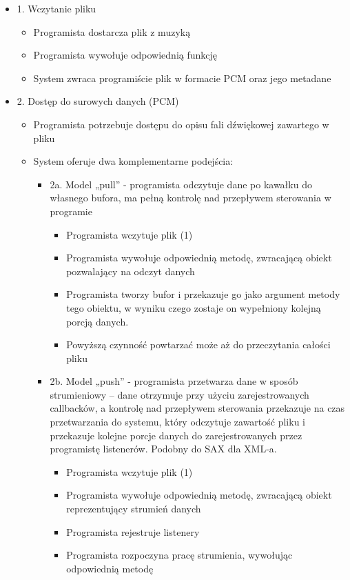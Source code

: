 \begin{itemize}
	\item 1. Wczytanie pliku
	\begin{itemize}
		\item Programista dostarcza plik z muzyką
		\item Programista wywołuje odpowiednią funkcję
		\item System zwraca programiście plik w formacie PCM oraz jego metadane
	\end{itemize}
	\item 2. Dostęp do surowych danych (PCM)
	\begin{itemize}
		\item Programista potrzebuje dostępu do opisu fali dźwiękowej zawartego w pliku
		\item System oferuje dwa komplementarne podejścia:
		\begin{itemize}
			\item 2a. Model „pull” - programista odczytuje dane po kawałku do własnego bufora, ma pełną kontrolę nad przepływem sterowania w programie
			\begin{itemize}
				\item Programista wczytuje plik (1)
				\item Programista wywołuje odpowiednią metodę, zwracającą obiekt pozwalający na odczyt danych
				\item Programista tworzy bufor i przekazuje go jako argument metody tego obiektu, w wyniku czego zostaje on wypełniony kolejną porcją danych.
				\item Powyższą czynność powtarzać może aż do przeczytania całości pliku
			\end{itemize}
			\item 2b. Model „push” - programista przetwarza dane w sposób strumieniowy – dane otrzymuje przy użyciu zarejestrowanych callbacków, a kontrolę nad przepływem sterowania przekazuje na czas przetwarzania do systemu, który odczytuje zawartość pliku i przekazuje kolejne porcje danych do zarejestrowanych przez programistę listenerów. Podobny do SAX dla XML-a.
			\begin{itemize}
				\item Programista wczytuje plik (1)
				\item Programista wywołuje odpowiednią metodę, zwracającą obiekt reprezentujący strumień danych
				\item Programista rejestruje listenery
				\item Programista rozpoczyna pracę strumienia, wywołując odpowiednią metodę
			\end{itemize}
		\end{itemize}
	\end{itemize}
\end{itemize}

